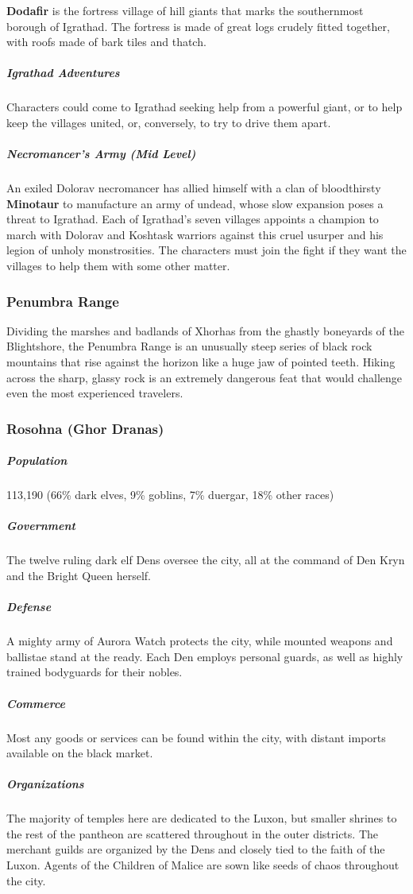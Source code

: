 \documentclass[10pt,a4paper,twoside,bg=print,twocolumn,openany,nodeprecatedcode]{dndbook}
\begin{document}
\textbf{Dodafir} is the fortress village of hill giants that marks the southernmost borough of Igrathad. The fortress is made of great logs crudely fitted together, with roofs made of bark tiles and thatch.

\subparagraph{Igrathad Adventures}
Characters could come to Igrathad seeking help from a powerful giant, or to help keep the villages united, or, conversely, to try to drive them apart.

\subparagraph{Necromancer's Army (Mid Level)}
An exiled Dolorav necromancer has allied himself with a clan of bloodthirsty \textbf{Minotaur} to manufacture an army of undead, whose slow expansion poses a threat to Igrathad. Each of Igrathad's seven villages appoints a champion to march with Dolorav and Koshtask warriors against this cruel usurper and his legion of unholy monstrosities. The characters must join the fight if they want the villages to help them with some other matter.

\subsubsection{Penumbra Range}
Dividing the marshes and badlands of Xhorhas from the ghastly boneyards of the Blightshore, the Penumbra Range is an unusually steep series of black rock mountains that rise against the horizon like a huge jaw of pointed teeth. Hiking across the sharp, glassy rock is an extremely dangerous feat that would challenge even the most experienced travelers.

\subsubsection{Rosohna (Ghor Dranas)}
\subparagraph{Population}
113,190 (66\% dark elves, 9\% goblins, 7\% duergar, 18\% other races)

\subparagraph{Government}
The twelve ruling dark elf Dens oversee the city, all at the command of Den Kryn and the Bright Queen herself.

\subparagraph{Defense}
A mighty army of Aurora Watch protects the city, while mounted weapons and ballistae stand at the ready. Each Den employs personal guards, as well as highly trained bodyguards for their nobles.

\subparagraph{Commerce}
Most any goods or services can be found within the city, with distant imports available on the black market.

\subparagraph{Organizations}
The majority of temples here are dedicated to the Luxon, but smaller shrines to the rest of the pantheon are scattered throughout in the outer districts. The merchant guilds are organized by the Dens and closely tied to the faith of the Luxon. Agents of the Children of Malice are sown like seeds of chaos throughout the city.
\end{document}
